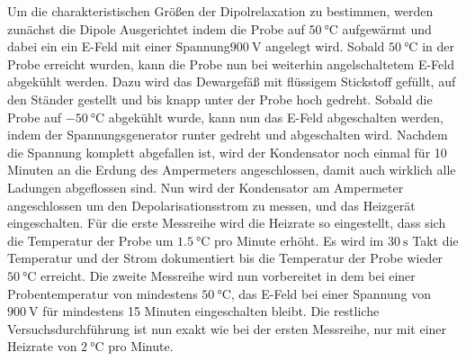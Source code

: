     Um die charakteristischen Größen der Dipolrelaxation zu bestimmen, 
    werden zunächst die Dipole Ausgerichtet indem die Probe auf $\SI{50}{\celsius}$ aufgewärmt und dabei ein ein E-Feld mit einer Spannung$\SI{900}{\volt}$ angelegt wird.
    Sobald $\SI{50}{\celsius}$ in der Probe erreicht wurden, kann die Probe nun bei weiterhin angelschaltetem E-Feld abgekühlt werden.
    Dazu wird das Dewargefäß mit flüssigem Stickstoff gefüllt, auf den Ständer gestellt und bis knapp unter der Probe hoch gedreht.
    Sobald die Probe auf $\SI{-50}{\celsius}$ abgekühlt wurde, kann nun das E-Feld abgeschalten werden, indem der Spannungsgenerator runter gedreht und abgeschalten wird.
    Nachdem die Spannung komplett abgefallen ist, wird der Kondensator noch einmal für 10 Minuten an die Erdung des Ampermeters angeschlossen, damit auch wirklich alle Ladungen abgeflossen sind.
    Nun wird der Kondensator am Ampermeter angeschlossen um den Depolarisationsstrom zu messen, und das Heizgerät eingeschalten.
    Für die erste Messreihe wird die Heizrate so eingestellt, dass sich die Temperatur der Probe um $\SI{1.5}{\celsius}$ pro Minute erhöht.
    Es wird im $\SI{30}{\second}$ Takt die Temperatur und der Strom dokumentiert bis die Temperatur der Probe wieder $\SI{50}{\celsius}$ erreicht. 
    Die zweite Messreihe wird nun vorbereitet in dem bei einer Probentemperatur von mindestens $\SI{50}{\celsius}$, das E-Feld bei einer Spannung von $\SI{900}{\volt}$ für mindestens 15 Minuten eingeschalten bleibt.
    Die restliche Versuchsdurchführung ist nun exakt wie bei der ersten Messreihe, nur mit einer Heizrate von $\SI{2}{\celsius}$ pro Minute.
